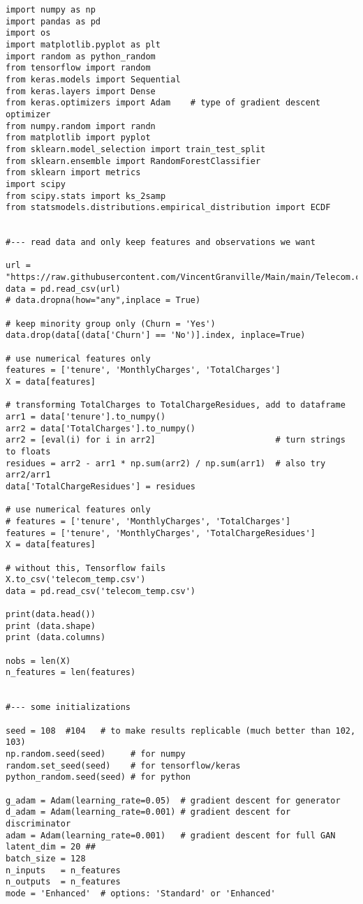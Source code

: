 \documentclass[oneside,10pt]{book}
\begin{document}
\begin{lstlisting}
import numpy as np
import pandas as pd
import os
import matplotlib.pyplot as plt
import random as python_random
from tensorflow import random
from keras.models import Sequential
from keras.layers import Dense
from keras.optimizers import Adam    # type of gradient descent optimizer
from numpy.random import randn
from matplotlib import pyplot
from sklearn.model_selection import train_test_split
from sklearn.ensemble import RandomForestClassifier
from sklearn import metrics
import scipy
from scipy.stats import ks_2samp
from statsmodels.distributions.empirical_distribution import ECDF


#--- read data and only keep features and observations we want

url = "https://raw.githubusercontent.com/VincentGranville/Main/main/Telecom.csv"
data = pd.read_csv(url)
# data.dropna(how="any",inplace = True)

# keep minority group only (Churn = 'Yes')
data.drop(data[(data['Churn'] == 'No')].index, inplace=True)

# use numerical features only
features = ['tenure', 'MonthlyCharges', 'TotalCharges']
X = data[features]

# transforming TotalCharges to TotalChargeResidues, add to dataframe
arr1 = data['tenure'].to_numpy()
arr2 = data['TotalCharges'].to_numpy()
arr2 = [eval(i) for i in arr2]                        # turn strings to floats
residues = arr2 - arr1 * np.sum(arr2) / np.sum(arr1)  # also try arr2/arr1
data['TotalChargeResidues'] = residues

# use numerical features only
# features = ['tenure', 'MonthlyCharges', 'TotalCharges']
features = ['tenure', 'MonthlyCharges', 'TotalChargeResidues']
X = data[features]

# without this, Tensorflow fails
X.to_csv('telecom_temp.csv')
data = pd.read_csv('telecom_temp.csv')

print(data.head())
print (data.shape)
print (data.columns)

nobs = len(X)
n_features = len(features)


#--- some initializations

seed = 108  #104   # to make results replicable (much better than 102, 103)
np.random.seed(seed)     # for numpy
random.set_seed(seed)    # for tensorflow/keras
python_random.seed(seed) # for python

g_adam = Adam(learning_rate=0.05)  # gradient descent for generator
d_adam = Adam(learning_rate=0.001) # gradient descent for discriminator
adam = Adam(learning_rate=0.001)   # gradient descent for full GAN
latent_dim = 20 ##
batch_size = 128
n_inputs   = n_features
n_outputs  = n_features
mode = 'Enhanced'  # options: 'Standard' or 'Enhanced'



\end{lstlisting}
\end{document}
